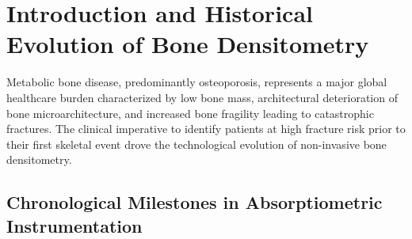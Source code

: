 \documentclass[11pt,a4paper]{article}
\begin{document}
\tableofcontents
\newpage

\section{Introduction and Historical Evolution of Bone Densitometry}

Metabolic bone disease, predominantly osteoporosis, represents a major global healthcare burden characterized by low bone mass, architectural deterioration of bone microarchitecture, and increased bone fragility leading to catastrophic fractures. The clinical imperative to identify patients at high fracture risk prior to their first skeletal event drove the technological evolution of non-invasive bone densitometry.

\subsection{Chronological Milestones in Absorptiometric Instrumentation}
\end{document}
